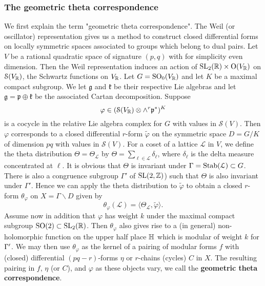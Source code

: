 \subsubsection*{The geometric theta correspondence}

We first explain the term "geometric theta correspondence". The Weil (or oscillator) representation gives us a method to construct closed differential forms on locally
symmetric spaces associated to groups which belong to dual pairs. Let $V$ be a rational quadratic space of signature $(p,q)$ with for simplicity even dimension. Then the Weil representation induces an action of $\operatorname{SL}_2(\mathbb{R}) \times \operatorname{O}(V_{\mathbb{R}})$ on $\mathcal{S}(V_{\mathbb{R}})$, the Schwartz functions on $V_{\mathbb{R}}$. Let $G = \operatorname{SO}_0(V_{\mathbb{R}})$ and let $K$ be a maximal compact subgroup. We let $\mathfrak{g}$ and $\mathfrak{k}$ be their respective Lie algebras and let $\mathfrak{g} = \mathfrak{p} \oplus \mathfrak{k}$ be the associated Cartan decomposition. Suppose 
\[
\varphi\in (\mathcal{S}(V_{\mathbb{R}}) \otimes \wedge^r \mathfrak{p}^{\ast})^{K}
\]
is a cocycle in the relative
Lie algebra complex for $G$ with values in $\mathcal{S}(V)$. Then $\varphi$ corresponds to a closed differential $r$-form $\tilde{\varphi}$ on the symmetric space $D= G/K$ of dimension $pq$ with values in $\mathcal{S}(V)$.
For a coset of a lattice $\mathcal{L}$ in $V$, we define the theta distribution $\Theta=\Theta_{\mathcal{L}}$ by $\Theta = \sum_{\ell \in \mathcal{L}} \delta_{\ell}$, where $ \delta_{\ell}$ is the delta measure concentrated at $\ell$. It is obvious that $\Theta$ is invariant under $\Gamma = \operatorname{Stab}(\mathcal{L}) \subset G$. There is also a congruence subgroup $\Gamma'$ of $\operatorname{SL}(2,\mathbb{Z})$) such that $\Theta$ is also invariant under $\Gamma'$. Hence we can apply the theta distribution to $\tilde{\varphi}$ to obtain a closed $r$-form $\theta_{\varphi}$ on $X = \Gamma \backslash D$ given by 
\[
\theta_{\varphi}(\mathcal{L})= \langle \Theta_{\mathcal{L}}, \tilde{\varphi} \rangle.
\]
Assume now in addition that $\varphi$ has weight $k$ under the maximal compact subgroup $\operatorname{SO}(2) \subset \operatorname{SL}_2(\mathbb{R})$. Then $\theta_{\varphi}$ also gives rise to a (in general) non-holomorphic function on the upper half place $\mathbb{H}$ which is modular of weight $k$ for $\Gamma'$. We may then use $\theta_{\varphi}$ as the kernel of a pairing of modular forms $f$ with (closed) differential $(pq-r)$-forms $\eta$ or $r$-chains (cycles) $C$ in $X$. The resulting pairing in $f$, $\eta$ (or $C$), and $\varphi$ as these objects vary, we call the {\bf geometric theta correspondence}. 

